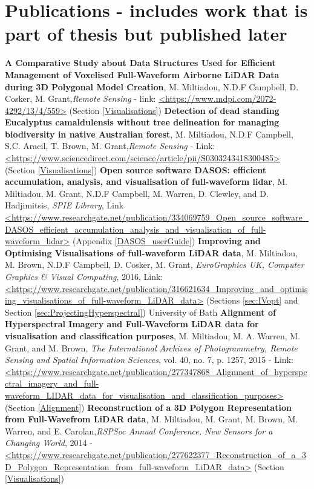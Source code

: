 \documentclass[11pt,nofootinbib]{report}
\begin{document}
	\section{Publications - includes work that is part of thesis but published later}
	    \textbf{A Comparative Study about Data Structures Used for Efficient Management of Voxelised Full-Waveform Airborne LiDAR Data during 3D Polygonal Model Creation}, M. Miltiadou, N.D.F Campbell, D. Cosker, M. Grant,\textit{Remote Sensing} - link: \url{<https://www.mdpi.com/2072-4292/13/4/559>} (Section \ref{Visualisations})\newline
		\textbf{Detection of dead standing Eucalyptus camaldulensis without tree delineation for managing biodiversity in native Australian forest},  M. Miltiadou, N.D.F Campbell, S.C. Aracil, T. Brown, M. Grant,\textit{Remote Sensing} - Link: \url{<https://www.sciencedirect.com/science/article/pii/S0303243418300485>} (Section \ref{Visualisations})\newline
		\textbf{Open source software DASOS: efficient accumulation, analysis, and visualisation of full-waveform lidar}, M. Miltiadou, M. Grant, N.D.F Campbell, M. Warren, D. Clewley, and D. Hadjimitsis, \textit{SPIE Library}, Link \url{<https://www.researchgate.net/publication/334069759_Open_source_software_DASOS_efficient_accumulation_analysis_and_visualisation_of_full-waveform_lidar>} (Appendix \ref{DASOS_userGuide})\newline
		\textbf{Improving and Optimising Visualisations of full-waveform LiDAR data}, M. Miltiadou, M. Brown, N.D.F Campbell,  D. Cosker, M. Grant, \textit{EuroGraphics UK, Computer Graphics \& Visual Computing}, 2016, Link: \url{<https://www.researchgate.net/publication/316621634_Improving_and_optimising_visualisations_of_full-waveform_LiDAR_data>} (Sections \ref{sec:IVopt} and Section \ref{sec:ProjectingHyperspectral}) \newline
		University of Bath
		\textbf{Alignment of Hyperspectral Imagery and Full-Waveform LiDAR data for visualisation and classification purposes}, M. Miltiadou, M. A. Warren, M. Grant, and M. Brown, \textit{The International Archives of Photogrammetry, Remote Sensing and Spatial Information Sciences}, vol. 40, no. 7, p. 1257, 2015 - Link: \url{<https://www.researchgate.net/publication/277347868_Alignment_of_hyperspectral_imagery_and_full-waveform_LIDAR_data_for_visualisation_and_classification_purposes>} (Section \ref{Alignment})\newline
		\textbf{Reconstruction of a 3D Polygon Representation from Full-Wavefrom LiDAR data}, M. Miltiadou, M. Grant, M. Brown, M. Warren, and E. Carolan,\textit{RSPSoc Annual Conference, New Sensors for a Changing World}, 2014 - \url{<https://www.researchgate.net/publication/277622377_Reconstruction_of_a_3D_Polygon_Representation_from_full-waveform_LiDAR_data>} (Section \ref{Visualisations})\newline
	 
\end{document}
